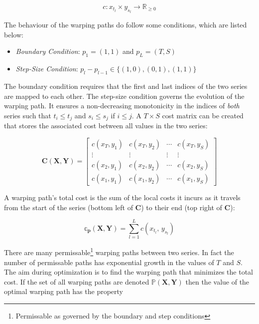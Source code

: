 \documentclass[12pt]{article}
\begin{document}
\begin{equation}
    c: x_{t_{l}} \times y_{s_{l}} \rightarrow \mathbb{R}_{\ge 0}
\end{equation}

The behaviour of the warping paths do follow some conditions, which are listed below:

\begin{itemize}
    \item \emph{Boundary Condition}: $p_{1} = (1, 1)$ and $p_{L} = (T, S)$ 
    \item \emph{Step-Size Condition}: $p_{l} - p_{l - 1} \in \{ (1, 0), (0, 1), (1, 1) \} $
\end{itemize}

The boundary condition requires that the first and last indices of the two series are mapped to each other. The step-size condition governs the evolution of the warping path. It ensures a non-decreasing monotonicity in the indices of \emph{both} series such that $t_{i} \le t_{j}$ and $s_{i} \le s_{j}$ if $i \le j$. A $T \times S$ cost matrix can be created that stores the associated cost between all values in the two series:

\begin{equation}
    \mathbf{C}(\boldsymbol{X}, \boldsymbol{Y}) = \left[ 
        \begin{array}{cccc}
            c(x_{T}, y_{1}) & c(x_{T}, y_{2}) & \cdots & c(x_{T}, y_{S}) \\ 
            \vdots          & \vdots          & \vdots & \vdots          \\
            c(x_{2}, y_{1}) & c(x_{2}, y_{2}) & \cdots & c(x_{2}, y_{S}) \\ 
            c(x_{1}, y_{1}) & c(x_{1}, y_{2}) & \cdots & c(x_{1}, y_{S})
    \end{array}\right]
\end{equation}

A warping path's total cost is the sum of the local costs it incurs as it travels from the start of the series (bottom left of $\boldsymbol{C}$) to their end (top right of $\boldsymbol{C}$):

\begin{equation} \label{eq:dtw_cost_matrix_definition}
    \mathbb{c}_{\boldsymbol{p}}(\boldsymbol{X}, \boldsymbol{Y}) = \sum^{L}_{l=1} c(x_{t_{l}},\, y_{s_{l}})
\end{equation}

There are many permissable\footnote{Permissable as governed by the boundary and step conditions} warping paths between two series. In fact the number of permissable paths has exponential growth in the values of $T$ and $S$. The aim during optimization is to find the warping path that minimizes the total cost. If the set of all warping paths are denoted $\mathbb{P}(\boldsymbol{X}, \boldsymbol{Y})$ then the value of the optimal warping path has the property
\end{document}
